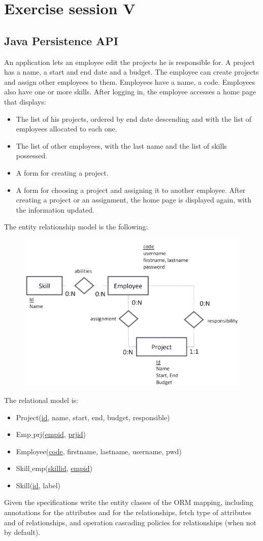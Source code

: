 \documentclass[12pt, a4paper]{report}
\begin{document}
    \chapter{Exercise session V}
        \section{Java Persistence API}
            An application lets an employee edit the projects he is responsible for. A project has a name, a start and end date and a budget. The employee can create 
            projects and assign other employees to them. Employees have a name, a code. Employees also have one or more skills. After logging in, the employee accesses 
            a home page that displays:
            \begin{itemize}
                \item The list of his projects, ordered by end date descending and with the list of employees allocated to each one. 
                \item The list of other employees, with the last name and the list of skills possessed. 
                \item A form for creating a project. 
                \item A form for choosing a project and assigning it to another employee. After creating a project or an assignment, the home page is displayed again, 
                    with the information updated. 
            \end{itemize}
            The entity relationship model is the following:
            \begin{figure}[H]
                \centering
                \includegraphics[width=0.5\linewidth]{images/e-r.png}
            \end{figure}
            The relational model is: 
            \begin{itemize}
                \item Project(\underline{id}, name, start, end, budget, responsible)
                \item Emp$\_$prj(\underline{empid}, \underline{prjid})
                \item Employee(\underline{code}, firstname, lastname, username, pwd)
                \item Skill$\_$emp(\underline{skillid}, \underline{empid})
                \item Skill(\underline{id}, label)
            \end{itemize}
            Given the specifications write the entity classes of the ORM mapping, including annotations for the attributes and for the relationships, fetch type of attributes
            and of relationships, and operation cascading policies for relationships (when not by default). 
\end{document}
